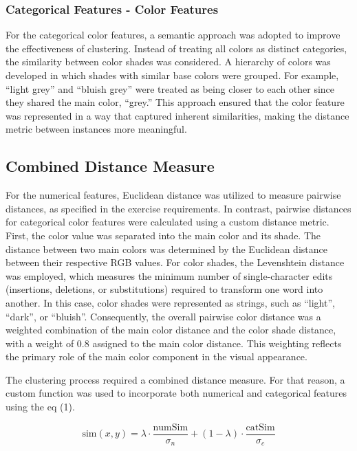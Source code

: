 \subsubsection{Categorical Features - Color Features}
For the categorical color features, a semantic approach was adopted to improve the effectiveness of clustering. Instead of treating all colors as distinct categories, the similarity between color shades was considered. A hierarchy of colors was developed in which shades with similar base colors were grouped. For example, ``light grey'' and ``bluish grey'' were treated as being closer to each other since they shared the main color, ``grey.'' This approach ensured that the color feature was represented in a way that captured inherent similarities, making the distance metric between instances more meaningful.



\subsection{Combined Distance Measure}

For the numerical features, Euclidean distance was utilized to measure pairwise distances,
as specified in the exercise requirements. In contrast, pairwise distances for categorical
color features were calculated using a custom distance metric. First, the color value was
separated into the main color and its shade. The distance between two main colors was
determined by the Euclidean distance between their respective RGB values. For color shades,
the Levenshtein distance was employed, which measures the minimum number of single-character
edits (insertions, deletions, or substitutions) required to transform one word into another.
In this case, color shades were represented as strings, such as ``light'', ``dark'', or ``bluish''.
Consequently, the overall pairwise color distance was a weighted combination of the main color
distance and the color shade distance, with a weight of 0.8 assigned to the main color distance.
This weighting reflects the primary role of the main color component in the visual appearance.

The clustering process required a combined distance measure. For that reason, a custom function was used to incorporate both numerical and categorical features using the eq (1).

\begin{equation}
    \text{sim}(x, y) = \lambda \cdot \frac{\text{numSim}}{\sigma_n} + (1 - \lambda) \cdot \frac{\text{catSim}}{\sigma_c}
    \label{eq:1}
\end{equation}

